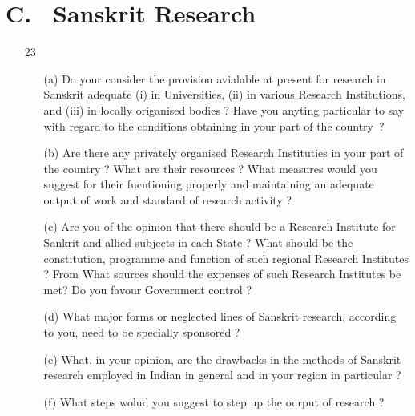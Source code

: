 \section*{{\rm C.~ Sanskrit Research}}

{\rm 
\begin{itemize}

   \item[23] \begin{itemize}
             \item[(a)] Do your consider the provision avialable at present for research in Sanskrit adequate (i) in Universities, (ii) in various Research Institutions, and (iii) in locally origanised bodies ? Have you anyting particular to say with regard to the conditions obtaining in your part of the country~?
             
             \item[(b)] Are there any privately organised Research Instituties in your part of the country ? What are their resources ? What measures would you suggest for their fucntioning properly and maintaining an adequate output of work and standard of research activity ?
   
              \item[(c)] Are you of the opinion that there should be a Research Institute for Sankrit and allied subjects in each State ? What should be the constitution, programme and function of such regional Research Institutes ? From What sources should the expenses of such Research Institutes be met? Do you favour Government  control ? 
              
              \item[(d)] What major forms or neglected lines of Sanskrit research, according to you, need to be specially sponsored ?
              
              \item[(e)] What, in your opinion, are the drawbacks in the methods of Sanskrit research employed in Indian in general and in your region in particular ? 
              
              \item[(f)] What steps wolud you suggest to step up the ourput of research ?
              \end{itemize}
\end{itemize}
}

